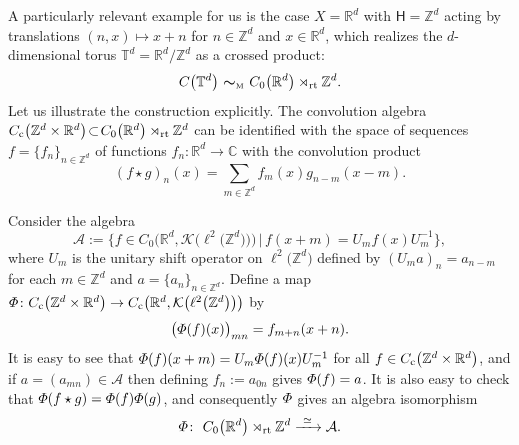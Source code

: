 \documentclass[pdftex]{sigma}
\numberwithin{equation}{section}
\newcommand{\Z}{\zed}
\newcommand{\mbf}[1]{{\boldsymbol {#1} }}
\newcommand{\CK}{\mathcal{K}}
\newcommand{\sfH}{\mathsf{H}}
\newcommand{\rt}{{\rm rt}}
\newcommand{\R}{\real}
\newcommand{\complex}{{\mathbb C}} %
\newcommand{\zed}{{\mathbb Z}} %
\newcommand{\real}{{\mathbb R}} %
\newcommand{\torus}{{\mathbb T}} %
\def\alg{{\mathcal A}}
\begin{document}
\begin{Example}[tori]\label{ex:Moritatori}
A particularly relevant example for us is the case $X=\real^d$ with
$\sfH=\zed^d$ acting by translations $(n,x)\mapsto x+n$ for
$n\in\zed^d$ and $x\in\real^d$, which realizes the
$d$-dimensional torus $\torus^d=\real^d/\zed^d$ as a crossed product:
\[
C\big(\torus^d\big) \ \mbf\sim_{\text{\tiny M}} \ C_0\big(\real^d\big)\rtimes_\rt \zed^d .
\]
Let us illustrate the construction explicitly. The convolution algebra
$C_{\rm c}\big(\Z^d\times\real^d\big)\!\subset\! C_0\big(\R^d\big)\rtimes_\rt\Z^d$ can be
identified with the space of sequences $f=\{f_n\}_{n\in\Z^d}$ of
functions $f_n\colon \real^d\to\complex$ with the convolution product
\[
(f\star g)_n(x) = \sum_{m\in\Z^d} f_m(x) g_{n-m}(x-m) .
\]

Consider the algebra
\[
\alg:=\big\{f\in C_0\big(\real^d,\CK\big(\ell^2\big(\zed^d\big)\big)\big) \, \big| \, f(x+m)
= U_m f(x) U_{m}^{-1}\big\} ,
\]
where $U_m$ is the unitary shift operator on $\ell^2\big(\zed^d\big)$ defined by
$(U_ma)_n=a_{n-m}$ for each $m\in\Z^d$ and $a=\{a_n\}_{n\in\Z^d}$.
Define a map ${\mit\Phi}\colon C_{\rm c}\big(\Z^d\times\real^d\big)\to
C_{\rm c}\big(\real^d,\CK\big(\ell^2\big(\Z^d\big)\big)\big)$ by
\[
\big({\mit\Phi}(f)(x)\big)_{mn} = f_{m+n}(x+n) .
\]
It is easy to see that ${\mit\Phi}(f)(x+m) =
U_m {\mit\Phi}(f)(x) U_m^{-1}$ for all $f\in C_{\rm
 c}\big(\zed^d\times\real^d\big)$, and if $a=(a_{mn})\in\alg$ then defining
$f_n:=a_{0n}$ gives ${\mit\Phi}(f)=a$. It is also easy to check that
${\mit\Phi}(f\star g) = {\mit\Phi}(f) {\mit\Phi}(g)$, and consequently
$\mit\Phi$ gives an algebra isomorphism
\[
{\mit\Phi}\colon \ C_0\big(\real^d\big)\rtimes_\rt\zed^d \xrightarrow{ \ \simeq \ } \alg .
\]


\end{Example}
\end{document}
